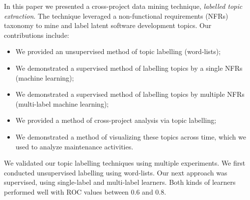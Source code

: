\documentclass[]{sig-alternate}
\begin{document}

In this paper we presented a cross-project data mining technique, \emph{labelled topic extraction}. The technique leveraged  a non-functional requirements (NFRs) taxonomy to mine and label latent software development topics. %
Our contributions include:
\begin{itemize}
\item We provided an unsupervised method of topic labelling (word-lists);
\item We demonstrated a supervised method of labelling topics by a single NFRs (machine learning);
\item We demonstrated a supervised method of labelling topics by multiple NFRs (multi-label machine learning);
\item We provided a method of cross-project analysis via topic labelling;
\item We demonstrated a method of visualizing these topics across time, which we used to analyze maintenance activities.
\end{itemize}


We validated our topic labelling techniques using multiple experiments. 
We first conducted unsupervised labelling using word-lists. 
Our next approach was supervised, using single-label and multi-label learners. 
Both kinds of learners performed well with 
ROC values between $0.6$ and $0.8$.
\end{document}

